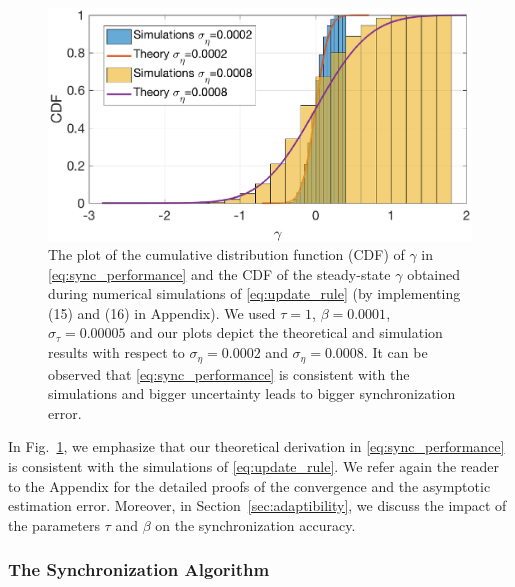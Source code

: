 \documentclass[10pt,journal,compsoc]{IEEEtran}
\begin{document}
\begin{figure}
	\centering
	\includegraphics[width=\columnwidth]{figures/sim-theory.eps}
	\caption{\label{fig:theory-vs-simulations} The plot of the cumulative distribution function (CDF) of $\gamma$ in \eqref{eq:sync_performance} and the CDF of the steady-state $\gamma$ obtained during numerical simulations of \eqref{eq:update_rule} (by implementing (15) and (16) in Appendix). We used $\tau=1$, $\beta= 0.0001$, $\sigma_{\tau}=0.00005$ and our plots depict the theoretical and simulation results with respect to $\sigma_\eta = 0.0002$ and $\sigma_\eta = 0.0008.$ It can be observed that \eqref{eq:sync_performance} is consistent with the simulations and bigger uncertainty leads to bigger synchronization error.}
\end{figure}
In Fig.~\ref{fig:theory-vs-simulations}, we emphasize that our theoretical derivation in \eqref{eq:sync_performance} is consistent with the simulations of \eqref{eq:update_rule}. We refer again the reader to the Appendix for the detailed proofs of the convergence and the asymptotic estimation error. Moreover, in Section~\ref{sec:adaptibility}, we discuss the impact of the parameters $\tau$ and $\beta$ on the synchronization accuracy.

\subsubsection{The Synchronization Algorithm}
\end{document}
